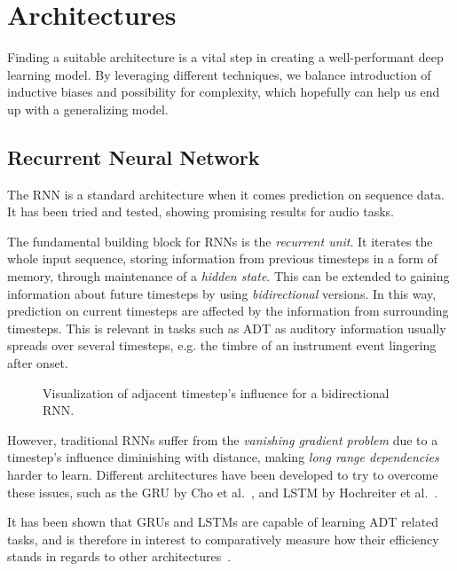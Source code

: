 \chapter{Architectures}

Finding a suitable architecture is a vital step in creating a well-performant deep learning model. By leveraging different techniques, we balance introduction of inductive biases and possibility for complexity, which hopefully can help us end up with a generalizing model.

\section{Recurrent Neural Network}

The \gls{RNN} is a standard architecture when it comes prediction on sequence data. It has been tried and tested, showing promising results for audio tasks.

The fundamental building block for \gls{RNN}s is the \textit{recurrent unit}. It iterates the whole input sequence, storing information from previous timesteps in a form of memory, through maintenance of a \textit{hidden state}. This can be extended to gaining information about future timesteps by using \textit{bidirectional} versions. In this way, prediction on current timesteps are affected by the information from surrounding timesteps. This is relevant in tasks such as \gls{ADT} as auditory information usually spreads over several timesteps, e.g. the timbre of an instrument event lingering after onset.

\begin{figure}[H]
    \centering
    
    \caption{Visualization of adjacent timestep's influence for a bidirectional RNN.}
    \label{RNNInfluenceFigure}
\end{figure}

However, traditional \gls{RNN}s suffer from the \textit{vanishing gradient problem} due to a timestep's influence diminishing with distance, making \textit{long range dependencies} harder to learn. Different architectures have been developed to try to overcome these issues, such as the \gls{GRU} by Cho et al.~\cite{DBLP:conf/emnlp/ChoMGBBSB14}, and \gls{LSTM} by Hochreiter et al.~\cite{10.1162/neco.1997.9.8.1735}.

It has been shown that \gls{GRU}s and \gls{LSTM}s are capable of learning \gls{ADT} related tasks, and is therefore in interest to comparatively measure how their efficiency stands in regards to other architectures~\cite{Southall2016AutomaticDT, inproceedings, Vogl2017DrumTV, signals4040042}.

